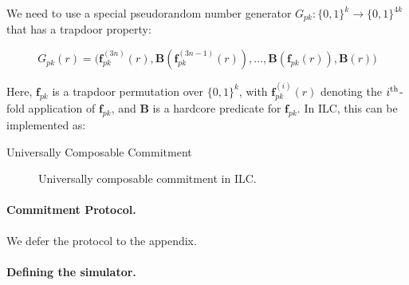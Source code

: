 

We need to use a special pseudorandom number generator $G_{pk} \colon \{0,1\}^k
\to \{0,1\}^{4k}$ that has a trapdoor property:

\[ G_{pk}(r) = \big(\mathbf{f}_{pk}^{(3n)}(r),
\mathbf{B}(\mathbf{f}_{pk}^{(3n-1)}(r)), \ldots, \mathbf{B}(\mathbf{f}_{pk}(r)),
\mathbf{B}(r)\big)\]

\noindent Here, $\mathbf{f}_{pk}$ is a trapdoor permutation over $\{0,1\}^{k}$,
with $\mathbf{f}_{pk}^{(i)}(r)$ denoting the $i^{\textnormal{th}}$-fold
application of $\mathbf{f}_{pk}$, and $\mathbf{B}$ is a hardcore predicate for
$\mathbf{f}_{pk}$. In ILC, this can be implemented as:


\begin{algorithm}
\DontPrintSemicolon

\smallskip
{}
\smallskip

\caption{Universally Composable Commitment}
\label{alg:com}
\end{algorithm}

\begin{figure}

\caption{Universally composable commitment in ILC.}
\label{fig:ucc}
\end{figure}

\paragraph{Commitment Protocol.}
We defer the protocol to the appendix.

\paragraph{Defining the simulator.}

